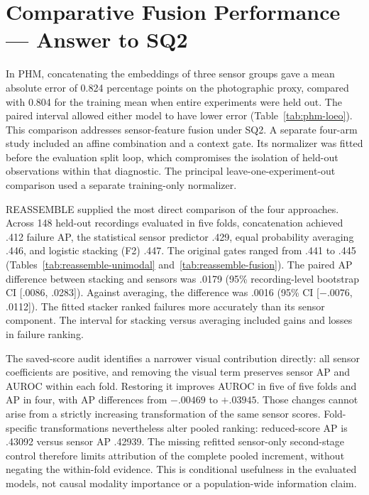 \section{Comparative Fusion Performance --- Answer to SQ2}
In PHM, concatenating the embeddings of three sensor groups gave a mean absolute error
of 0.824 percentage points on the photographic proxy, compared with 0.804 for the
training mean when entire experiments were held out. The paired interval allowed either
model to have lower error (Table~\ref{tab:phm-loeo}). This comparison addresses
sensor-feature fusion under SQ2. A separate four-arm study included an affine
combination and a context gate. Its normalizer was fitted before the evaluation split
loop, which compromises the isolation of held-out observations within that diagnostic.
The principal leave-one-experiment-out comparison used a separate training-only
normalizer.

REASSEMBLE supplied the most direct comparison of the four approaches. Across 148
held-out recordings evaluated in five folds, concatenation achieved .412 failure AP, the
statistical sensor predictor .429, equal probability averaging .446, and logistic
stacking (F2) .447. The original gates ranged from .441 to .445
(Tables~\ref{tab:reassemble-unimodal} and~\ref{tab:reassemble-fusion}). The paired AP
difference between stacking and sensors was .0179 (95\% recording-level bootstrap CI
[.0086, .0283]). Against averaging, the difference was .0016 (95\% CI [$-.0076$,
.0112]). The fitted stacker ranked failures more accurately than its sensor component.
The interval for stacking versus averaging included gains and losses in failure ranking.

The saved-score audit identifies a narrower visual contribution directly: all sensor
coefficients are positive, and removing the visual term preserves sensor AP and AUROC
within each fold. Restoring it improves AUROC in five of five folds and AP in four, with
AP differences from $-.00469$ to $+.03945$. Those changes cannot arise from a strictly
increasing transformation of the same sensor scores. Fold-specific transformations
nevertheless alter pooled ranking: reduced-score AP is .43092 versus sensor AP .42939.
The missing refitted sensor-only second-stage control therefore limits attribution of
the complete pooled increment, without negating the within-fold evidence. This is
conditional usefulness in the evaluated models, not causal modality importance or a
population-wide information claim.

